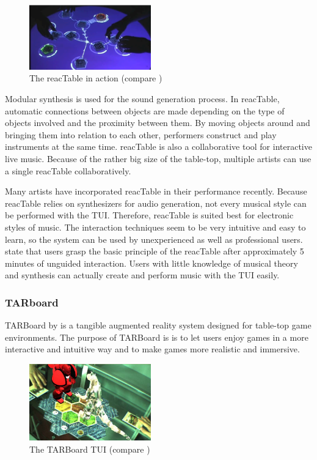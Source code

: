\begin{figure}
\centering
\includegraphics[width=0.47\textwidth]{figures/reactable.pdf}
\caption{The reacTable in action (compare \protect\cite{jorda07})}
\label{fig:reactable}
\end{figure}

Modular synthesis is used for the sound generation process. In reacTable, automatic connections between objects are made depending on the type of objects involved and the proximity between them. By moving objects around and bringing them into relation to each other, performers construct and play instruments at the same time. reacTable is also a collaborative tool for interactive live music. Because of the rather big size of the table-top, multiple artists can use a single reacTable collaboratively. 

Many artists have incorporated reacTable in their performance recently. Because reacTable relies on synthesizers for audio generation, not every musical style can be performed with the TUI. Therefore, reacTable is suited best for electronic styles of music. The interaction techniques seem to be very intuitive and easy to learn, so the system can be used by unexperienced as well as professional users. \cite{jorda07} state that users grasp the basic principle of the reacTable after approximately 5 minutes of unguided interaction. Users with little knowledge of musical theory and synthesis can actually create and perform music with the TUI easily. 

\subsubsection{TARboard}
TARBoard by \cite{lee05} is a tangible augmented reality system designed for table-top game environments. The purpose of TARBoard is is to let users enjoy games in a more interactive and intuitive way and to make games more realistic and immersive.

\begin{figure}
\centering
\includegraphics[width=0.47\textwidth]{figures/tarboard.jpg}
\caption{The TARBoard TUI (compare \protect\cite{lee05})}
\label{fig:tarboard}
\end{figure}

